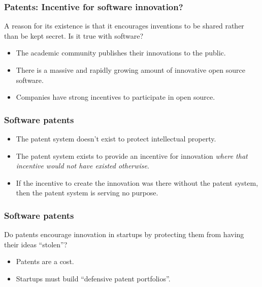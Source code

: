 \documentclass{beamer}
\begin{document}
\begin{frame}
\frametitle{Patents: Incentive for software innovation?}

A reason for its existence is that it encourages inventions to be shared rather than be kept secret. Is it true with software?

\pause

\begin{itemize}
\item The academic community publishes their innovations to the public.
\item There is a massive and rapidly growing amount of innovative open source software.
\item Companies have strong incentives to participate in open source.
\end{itemize}

\end{frame}


\begin{frame}
\frametitle{Software patents}

\begin{itemize}
\item The patent system doesn't exist to protect intellectual property.
\item The patent system exists to provide an incentive for innovation \textit{where that incentive would not have existed otherwise}.
\item If the incentive to create the innovation was there without the patent system, then the patent system is serving no purpose.
\end{itemize}

\end{frame}

\begin{frame}
\frametitle{Software patents}

Do patents encourage innovation in startups by protecting them from having their ideas ``stolen''?

\pause

\begin{itemize}
\item Patents are a cost.
\item Startups must build ``defensive patent portfolios''.
\end{itemize}

\end{frame}
\end{document}

